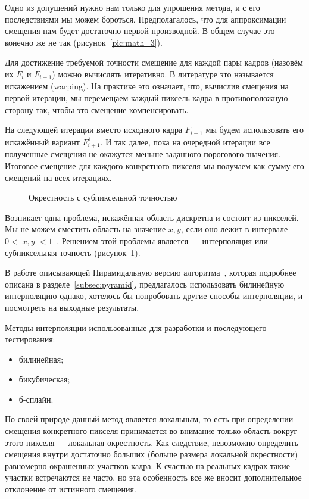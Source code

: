 Одно из допущений нужно нам только для упрощения метода, и с его последствиями мы можем бороться. Предполагалось, что для аппроксимации смещения нам будет достаточно первой производной. В общем случае это конечно же не так (рисунок~\ref{pic:math_3}). 

Для достижение требуемой точности смещение для каждой пары кадров (назовём их $F_i$ и $F_{i+1}$) можно вычислять итеративно. В литературе это называется искажением (warping). На практике это означает, что, вычислив смещения на первой итерации, мы перемещаем каждый пиксель кадра в противоположную сторону так, чтобы это смещение компенсировать.

На следующей итерации вместо исходного кадра $F_{i+1}$ мы будем использовать его искажённый вариант $F_{i+1}^1$. И так далее, пока на очередной итерации все полученные смещения не окажутся меньше заданного порогового значения. Итоговое смещение для каждого конкретного пикселя мы получаем как сумму его смещений на всех итерациях. 
\begin{figure}[ht]
\caption{Окрестность с субпиксельной точностью}
\label{pic:grid}
\end{figure}

Возникает одна проблема, искажённая область дискретна и состоит из пикселей. Мы не можем сместить область на значение $x,y$, если оно лежит в интервале $0< |x,y| < 1$~\cite{sub_toch}. Решением этой проблемы является — интерполяция или субпиксельная точность (рисунок~\ref{pic:grid}).

В работе описывающей Пирамидальную версию алгоритма~\cite{Bouguet2000}, которая подробнее описана в разделе~\ref{subsec:pyramid}, предлагалось использовать билинейную интерполяцию однако, хотелось бы попробовать другие способы интерполяции, и посмотреть на выходные результаты.

Методы интерполяции использованные для разработки и последующего тестирования:
\begin{itemize}
\item билинейная;
\item бикубическая;
\item б-сплайн.
\end{itemize}

По своей природе данный метод является локальным, то есть при определении смещения конкретного пикселя принимается во внимание только область вокруг этого пикселя — локальная окрестность. Как следствие, невозможно определить смещения внутри достаточно больших (больше размера локальной окрестности) равномерно окрашенных участков кадра. К счастью на реальных кадрах такие участки встречаются не часто, но эта особенность все же вносит дополнительное отклонение от истинного смещения.


